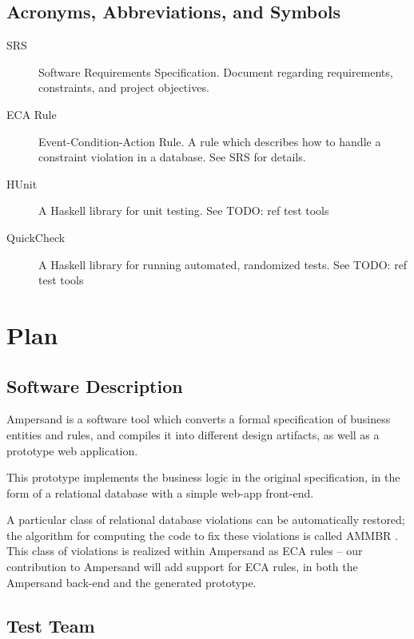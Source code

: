 \documentclass[12pt]{report}
\begin{document}
\section{Acronyms, Abbreviations, and Symbols}\label{sec:Abbrev}

\begin{description}
\item[SRS] Software Requirements Specification. Document regarding requirements, constraints, and project objectives.
\item[ECA Rule] Event-Condition-Action Rule. A rule which describes how to
  handle a constraint violation in a database. See SRS for details.
\item[HUnit] A Haskell library for unit testing. See TODO: ref test tools
\item[QuickCheck] A Haskell library for running automated, randomized tests. See TODO: ref test tools
\end{description}

%
%

\chapter{Plan}\label{ch:Plan}

\section{Software Description}\label{sec:SoftwareDesc}
Ampersand is a software tool which converts a formal specification of business
entities and rules, and compiles it into different design artifacts, as well as
a prototype web application.

This prototype implements the business logic in the original specification, in
the form of a relational database with a simple web-app front-end.

A particular class of relational database violations can be automatically
restored; the algorithm for computing the code to fix these violations is called
AMMBR \cite{amber}.  This class of violations is realized within Ampersand as
ECA rules -- our contribution to Ampersand will add support for ECA rules, in
both the Ampersand back-end and the generated prototype.

\section{Test Team}\label{sec:TestTeam}
\end{document}
